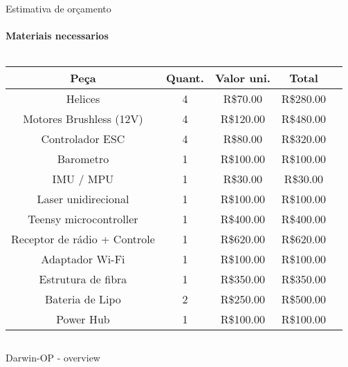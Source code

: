 \begin{frame}[t]{Estimativa de orçamento}
    \transboxout[duration=0.5]
    \framesubtitle{Materiais necessarios}
    \begin{columns}
        \centering
        \begin{tabular}{c | c | c | c | c}
                      Peça             & Quant. & Valor uni. & Total     &  \\ \hline
                    Helices            & 4      & R\$70.00   & R\$280.00 &  \\
            Motores Brushless (12V)    & 4      & R\$120.00  & R\$480.00 &  \\
                Controlador ESC        & 4      & R\$80.00   & R\$320.00 &  \\
                   Barometro           & 1      & R\$100.00  & R\$100.00 &  \\
                   IMU / MPU           & 1      & R\$30.00   & R\$30.00  &  \\
              Laser unidirecional      & 1      & R\$100.00  & R\$100.00 &  \\
             Teensy microcontroller    & 1      & R\$400.00  & R\$400.00 &  \\
          Receptor de rádio + Controle & 1      & R\$620.00  & R\$620.00 &  \\
                Adaptador Wi-Fi        & 1      & R\$100.00  & R\$100.00 &  \\
               Estrutura de fibra      & 1      & R\$350.00  & R\$350.00 &  \\
                Bateria de Lipo        & 2      & R\$250.00  & R\$500.00 &  \\
                   Power Hub           & 1      & R\$100.00  & R\$100.00 &
        \end{tabular}
    \end{columns}
\end{frame}
\begin{frame}[c]{Darwin-OP - overview}
    \centering


\end{frame}
